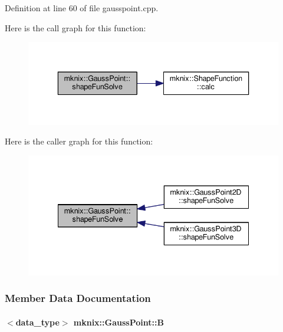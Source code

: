 Definition at line 60 of file gausspoint.\+cpp.



Here is the call graph for this function\+:\nopagebreak
\begin{figure}[H]
\begin{center}
\leavevmode
\includegraphics[width=336pt]{d2/da4/classmknix_1_1_gauss_point_a0428636dc89cb81d7143107872ec0923_cgraph}
\end{center}
\end{figure}




Here is the caller graph for this function\+:\nopagebreak
\begin{figure}[H]
\begin{center}
\leavevmode
\includegraphics[width=335pt]{d2/da4/classmknix_1_1_gauss_point_a0428636dc89cb81d7143107872ec0923_icgraph}
\end{center}
\end{figure}




\subsubsection{Member Data Documentation}
\hypertarget{classmknix_1_1_gauss_point_a986b9346095f1f4ed3542c5420818ad8}{}
\paragraph[{B}]{$<${\bf data\+\_\+type}$>$ mknix\+::\+Gauss\+Point\+::\+B\hspace{0.3cm}{\ttfamily [protected]}}\label{classmknix_1_1_gauss_point_a986b9346095f1f4ed3542c5420818ad8}


